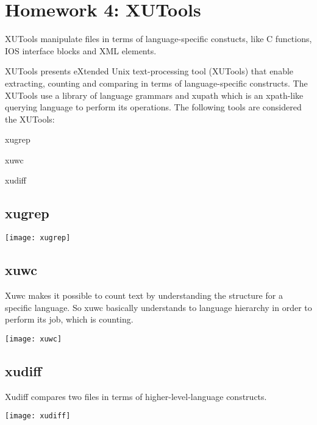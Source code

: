 
\section[Homework 4]{Homework 4: XUTools}

XUTools manipulate files in terms of language-specific constucts, like C functions, IOS interface blocks and XML elements.

XUTools presents eXtended Unix text-processing tool (XUTools) that enable extracting, counting and comparing in terms of language-specific constructs. The XUTools use a library of language grammars and xupath which is an xpath-like querying language to perform its operations. The following tools are considered the XUTools:

\begin{itemsize}
	\item xugrep
	\item xuwc
	\item xudiff
\end{itemsize}

\subsection{xugrep}

	\texttt{[image: xugrep]}

\subsection{xuwc}

Xuwc makes it possible to count text by understanding the structure for a specific language. So xuwc basically understands to language hierarchy in order to perform its job, which is counting. 

       \texttt{[image: xuwc]}

\subsection{xudiff}

Xudiff compares two files in terms of higher-level-language constructs.

	\texttt{[image: xudiff]}
